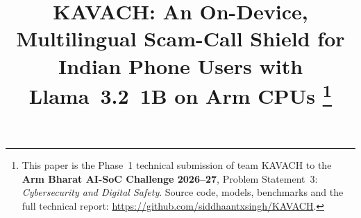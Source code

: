 \documentclass[conference]{IEEEtran}
\begin{document}
\title{KAVACH: An On-Device, Multilingual Scam-Call Shield for Indian Phone Users with Llama~3.2~1B on Arm CPUs%
\thanks{This paper is the Phase~1 technical submission of team KAVACH to the \textbf{Arm Bharat AI-SoC Challenge 2026--27}, Problem Statement~3: \emph{Cybersecurity and Digital Safety}. Source code, models, benchmarks and the full technical report: \url{https://github.com/siddhaantxsingh/KAVACH}.}}

\author{
\and
{}
}

\maketitle
\end{document}
